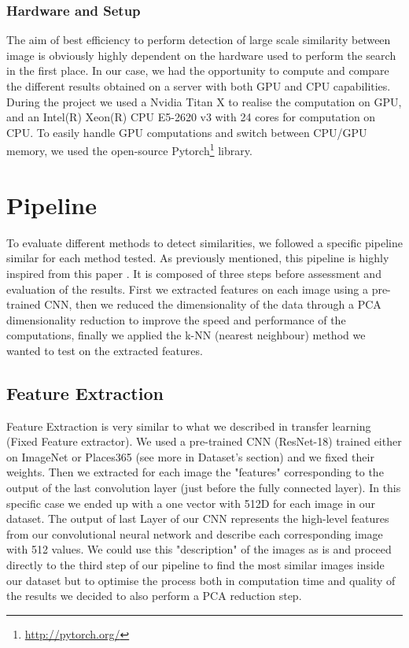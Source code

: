 \documentclass[a4paper]{article}
\begin{document}
		\subsubsection*{Hardware and Setup}
		The aim of best efficiency to perform detection of large scale similarity between image is obviously highly dependent on the hardware used to perform the search in the first place. In our case, we had the opportunity to compute and compare the different results obtained on a server with both GPU and CPU capabilities. During the project we used a Nvidia Titan X to realise the computation on GPU, and an Intel(R) Xeon(R) CPU E5-2620 v3 with 24 cores for computation on CPU. To easily handle GPU computations and switch between CPU/GPU memory, we used the open-source Pytorch\footnote{\url{http://pytorch.org/}} library.
		
\section{Pipeline}

To evaluate different methods to detect similarities, we followed a specific pipeline similar for each method tested. As previously mentioned, this pipeline is highly inspired from this paper \cite{large-scale-search}. It is composed of three steps before assessment and evaluation of the results. First we extracted features on each image using a pre-trained CNN, then we reduced the dimensionality of the data through a PCA dimensionality reduction to improve the speed and performance of the computations, finally we applied the k-NN (nearest neighbour) method we wanted to test on the extracted features.


\subsection{Feature Extraction}

Feature Extraction is very similar to what we described in transfer learning (Fixed Feature extractor). We used a pre-trained CNN (ResNet-18) trained either on ImageNet or Places365 (see more in Dataset's section) and we fixed their weights. Then we extracted for each image the "features" corresponding to the output of the last convolution layer (just before the fully connected layer). In this specific case we ended up with a one vector with 512D for each image in our dataset. The output of last Layer of our CNN represents the high-level features from our convolutional neural network and describe each corresponding image with 512 values. We could use this "description" of the images as is and proceed directly to the third step of our pipeline to find the most similar images inside our dataset but to optimise the process both in computation time and quality of the results we decided to also perform a PCA reduction step.
\end{document}
